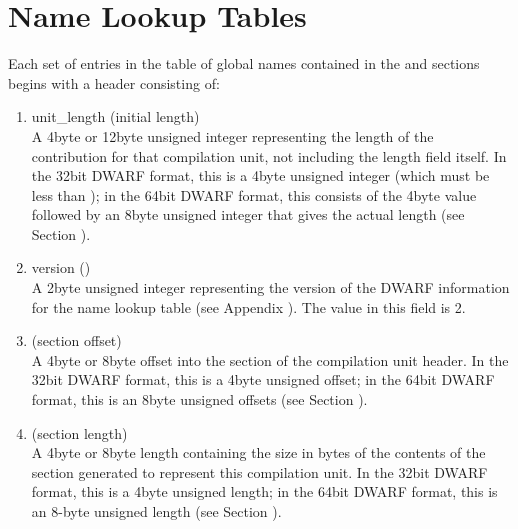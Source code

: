 \section{Name Lookup Tables}
\label{datarep:namelookuptables}

Each set of entries in the table of global names contained
in the  and 
 sections begins
with a header consisting of:
\begin{enumerate}[1. ]

\item unit\_length (initial length) \\
A 4\dash byte or 12\dash byte unsigned integer 
representing the length
of the 
contribution for that compilation unit,
not including the length field itself. In the 32\dash bit DWARF
format, this is a 4\dash byte unsigned integer (which must be less
than \xfffffffzero); in the 64\dash bit DWARF format, this consists
of the 4\dash byte value \wffffffff followed by an 8\dash byte unsigned
integer that gives the actual length
(see Section ).

\item  version () \\
A 2\dash byte unsigned integer representing the version of the
DWARF information for the name lookup table
(see Appendix ).
The value in this field is 2.

\item {} (section offset) \\
A 
4\dash byte or 8\dash byte 
offset into the 
section of the compilation unit header.
In
the 32\dash bit DWARF format, this is a 4\dash byte unsigned offset;
in the 64\dash bit DWARF format, this is an 8\dash byte unsigned offsets
(see Section ).

\item  {} (section length) \\
A 
4\dash byte or 8\dash byte length containing the size in bytes of the
contents of the 
section generated to represent
this compilation unit. In the 32\dash bit DWARF format, this is
a 4\dash byte unsigned length; in the 64\dash bit DWARF format, this
is an 8-byte unsigned length 
(see Section ).


\end{enumerate}

